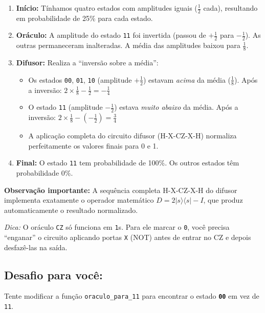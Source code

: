 \documentclass[
  brazilian,
]{report}
\providecommand{\tightlist}{%
  \setlength{\itemsep}{0pt}\setlength{\parskip}{0pt}}
\begin{document}
\begin{enumerate}
\def\labelenumi{\arabic{enumi}.}
\tightlist
\item
  \textbf{Início:} Tínhamos quatro estados com amplitudes iguais
  (\(\frac{1}{2}\) cada), resultando em probabilidade de 25\% para cada
  estado.
\item
  \textbf{Oráculo:} A amplitude do estado \texttt{11} foi invertida
  (passou de \(+\frac{1}{2}\) para \(-\frac{1}{2}\)). As outras
  permaneceram inalteradas. A média das amplitudes baixou para
  \(\frac{1}{8}\).
\item
  \textbf{Difusor:} Realiza a ``inversão sobre a média'':

  \begin{itemize}
  \tightlist
  \item
    Os estados \texttt{00}, \texttt{01}, \texttt{10} (amplitude
    \(+\frac{1}{2}\)) estavam \emph{acima} da média (\(\frac{1}{8}\)).
    Após a inversão:
    \(2 \times \frac{1}{8} - \frac{1}{2} = -\frac{1}{4}\)
  \item
    O estado \texttt{11} (amplitude \(-\frac{1}{2}\)) estava \emph{muito
    abaixo} da média. Após a inversão:
    \(2 \times \frac{1}{8} - (-\frac{1}{2}) = \frac{3}{4}\)
  \item
    A aplicação completa do circuito difusor (H-X-CZ-X-H) normaliza
    perfeitamente os valores finais para 0 e 1.
  \end{itemize}
\item
  \textbf{Final:} O estado \texttt{11} tem probabilidade de 100\%. Os
  outros estados têm probabilidade 0\%.
\end{enumerate}

\textbf{Observação importante:} A sequência completa H-X-CZ-X-H do
difusor implementa exatamente o operador matemático
\(D = 2|s\rangle\langle s| - I\), que produz automaticamente o resultado
normalizado.

\emph{Dica:} O oráculo \texttt{CZ} só funciona em \texttt{1}s. Para ele
marcar o \texttt{0}, você precisa ``enganar'' o circuito aplicando
portas \texttt{X} (NOT) antes de entrar no CZ e depois desfazê-las na
saída.

\subsection{Desafio para você:}\label{desafio-para-vocuxea}

Tente modificar a função \texttt{oraculo\_para\_11} para encontrar o
estado \textbf{\texttt{00}} em vez de \texttt{11}.
\end{document}
